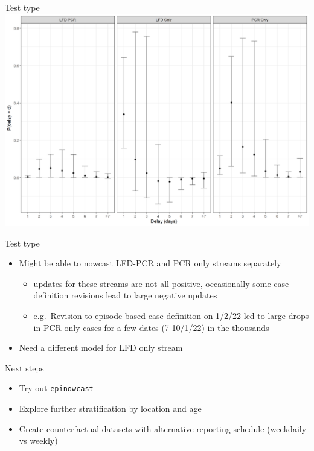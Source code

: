 \documentclass[
  ignorenonframetext,
]{beamer}
\providecommand{\tightlist}{%
  \setlength{\itemsep}{0pt}\setlength{\parskip}{0pt}}\usepackage{longtable,booktabs,array}
\begin{document}
\begin{frame}{Test type}
\protect\hypertarget{test-type}{}
\includegraphics{progress_presentation_files/figure-beamer/unnamed-chunk-5-1.png}
\end{frame}

\begin{frame}{Test type}
\protect\hypertarget{test-type-1}{}
\begin{itemize}
\tightlist
\item
  Might be able to nowcast LFD-PCR and PCR only streams separately

  \begin{itemize}
  \tightlist
  \item
    updates for these streams are not all positive, occasionally some
    case definition revisions lead to large negative updates
  \item
    e.g.~\href{https://coronavirus.data.gov.uk/details/whats-new/record/8055ae4e-ba2a-450a-bff8-42e9e4d1575b}{Revision
    to episode-based case definition} on 1/2/22 led to large drops in
    PCR only cases for a few dates (7-10/1/22) in the thousands
  \end{itemize}
\item
  Need a different model for LFD only stream
\end{itemize}
\end{frame}

\begin{frame}[fragile]{Next steps}
\protect\hypertarget{next-steps}{}
\begin{itemize}
\tightlist
\item
  Try out \texttt{epinowcast}
\item
  Explore further stratification by location and age
\item
  Create counterfactual datasets with alternative reporting schedule
  (weekdaily vs weekly)
\end{itemize}
\end{frame}
\end{document}
